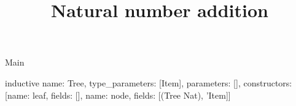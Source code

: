 \begin{lexlean}{Main}
\title{Natural number addition}
\begin{semanticmodule}
inductive{
  name: Tree,
  type_parameters: [Item],
  parameters: [],
  constructors: [{name: leaf, fields: []}, {name: node, fields: [(Tree Nat), 'Item]}]
}
\end{semanticmodule}
\end{lexlean}
